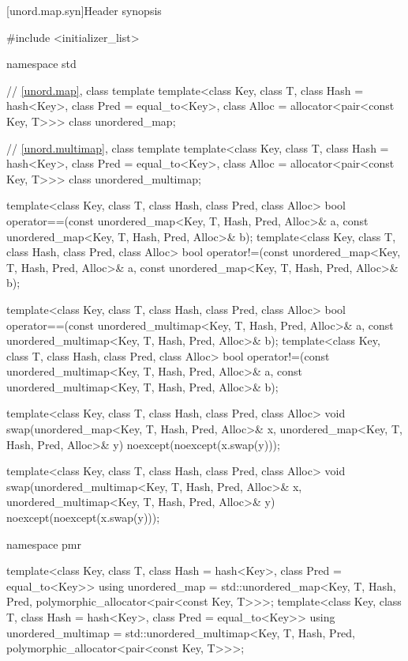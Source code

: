 [unord.map.syn]{Header  synopsis}%
%
%
%
\begin{codeblock}
#include <initializer_list>

namespace std {
  // \ref{unord.map}, class template 
  template<class Key,
           class T,
           class Hash = hash<Key>,
           class Pred = equal_to<Key>,
           class Alloc = allocator<pair<const Key, T>>>
    class unordered_map;

  // \ref{unord.multimap}, class template 
  template<class Key,
           class T,
           class Hash = hash<Key>,
           class Pred = equal_to<Key>,
           class Alloc = allocator<pair<const Key, T>>>
    class unordered_multimap;

  template<class Key, class T, class Hash, class Pred, class Alloc>
    bool operator==(const unordered_map<Key, T, Hash, Pred, Alloc>& a,
                    const unordered_map<Key, T, Hash, Pred, Alloc>& b);
  template<class Key, class T, class Hash, class Pred, class Alloc>
    bool operator!=(const unordered_map<Key, T, Hash, Pred, Alloc>& a,
                    const unordered_map<Key, T, Hash, Pred, Alloc>& b);

  template<class Key, class T, class Hash, class Pred, class Alloc>
    bool operator==(const unordered_multimap<Key, T, Hash, Pred, Alloc>& a,
                    const unordered_multimap<Key, T, Hash, Pred, Alloc>& b);
  template<class Key, class T, class Hash, class Pred, class Alloc>
    bool operator!=(const unordered_multimap<Key, T, Hash, Pred, Alloc>& a,
                    const unordered_multimap<Key, T, Hash, Pred, Alloc>& b);

  template<class Key, class T, class Hash, class Pred, class Alloc>
    void swap(unordered_map<Key, T, Hash, Pred, Alloc>& x,
              unordered_map<Key, T, Hash, Pred, Alloc>& y)
      noexcept(noexcept(x.swap(y)));

  template<class Key, class T, class Hash, class Pred, class Alloc>
    void swap(unordered_multimap<Key, T, Hash, Pred, Alloc>& x,
              unordered_multimap<Key, T, Hash, Pred, Alloc>& y)
      noexcept(noexcept(x.swap(y)));

  namespace pmr {
    template<class Key,
             class T,
             class Hash = hash<Key>,
             class Pred = equal_to<Key>>
      using unordered_map =
        std::unordered_map<Key, T, Hash, Pred,
                           polymorphic_allocator<pair<const Key, T>>>;
    template<class Key,
             class T,
             class Hash = hash<Key>,
             class Pred = equal_to<Key>>
      using unordered_multimap =
        std::unordered_multimap<Key, T, Hash, Pred,
                                polymorphic_allocator<pair<const Key, T>>>;

  }
}
\end{codeblock}

